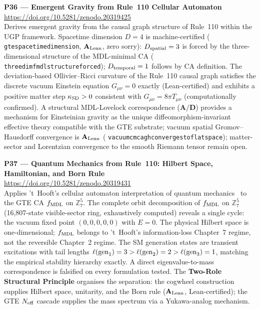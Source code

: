 \documentclass[11pt]{article}
\newcommand{\lean}[1]{%
  \penalty-100
  \begingroup\def\_{{\textunderscore\allowbreak}}\texttt{#1}\endgroup}
\newcommand{\CatAL}{\ensuremath{\textbf{A}_{\rm Lean}}}
\newcommand{\CatAD}{\textbf{A/D}}
\begin{document}
\medskip
\noindent\textbf{P36 — Emergent Gravity from Rule~110 Cellular Automaton}~\cite{SpivackEmergentGravity}\\
\url{https://doi.org/10.5281/zenodo.20319425}\\
Derives emergent gravity from the causal graph structure of Rule~110 within the UGP
framework.
Spacetime dimension $D = 4$ is machine-certified
(\lean{gte\_spacetime\_dimension}, $\CatAL$, zero sorry): $D_{\rm spatial}=3$ is
forced by the three-dimensional structure of the MDL-minimal CA
(\lean{three\_dim\_fmdl\_structure\_forced}); $D_{\rm temporal}=1$ follows by CA
definition.
The deviation-based Ollivier--Ricci curvature of the Rule~110 causal graph satisfies
the discrete vacuum Einstein equation $G_{\mu\nu}=0$ exactly (Lean-certified) and
exhibits a positive matter step $\kappa_{\rm SD}>0$ consistent with
$G_{\mu\nu}=8\pi T_{\mu\nu}$ (computationally confirmed).  A structural
MDL-Lovelock correspondence ($\CatAD$) provides a mechanism for Einsteinian gravity
as the unique diffeomorphism-invariant effective theory compatible with the GTE
substrate; vacuum spatial Gromov--Hausdorff convergence is \CatAL{}
(\lean{vacuum\_cmca\_gh\_converges\_to\_flat\_space}); matter-sector and Lorentzian
convergence to the smooth Riemann tensor remain open.

\medskip
\noindent\textbf{P37 — Quantum Mechanics from Rule~110: Hilbert Space, Hamiltonian,
and Born Rule}~\cite{SpivackQMFromR110}\\
\url{https://doi.org/10.5281/zenodo.20319431}\\
Applies 't~Hooft's cellular automaton interpretation of quantum
mechanics~\cite{tHooft2016CA} to the GTE CA $f_{\rm MDL}$ on $\mathbb{Z}_7^5$.
The complete orbit decomposition of $f_{\rm MDL}$ on $\mathbb{Z}_7^5$
(16,807-state visible-sector ring, exhaustively computed) reveals a single cycle:
the vacuum fixed point $(0,0,0,0,0)$ with $E=0$.  The physical Hilbert space is
one-dimensional; $f_{\rm MDL}$ belongs to 't~Hooft's information-loss Chapter~7
regime, not the reversible Chapter~2 regime.
The SM generation states are transient excitations with tail lengths
$\ell({\rm gen}_1)=3 > \ell({\rm gen}_2)=2 > \ell({\rm gen}_3)=1$,
matching the empirical stability hierarchy exactly.  A direct eigenvalue-to-mass
correspondence is falsified on every formulation tested.  The \textbf{Two-Role
Structural Principle} organises the separation: the cogwheel construction supplies
Hilbert space, unitarity, and the Born rule ($\CatAL$, Lean-certified); the GTE
$N_{\rm eff}$ cascade supplies the mass spectrum via a Yukawa-analog mechanism.
\end{document}
